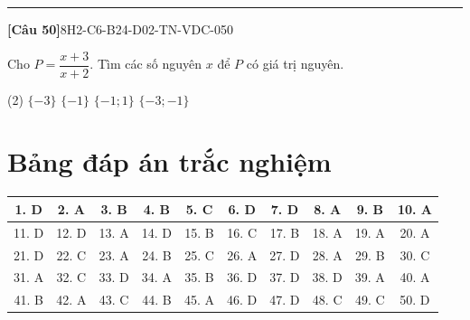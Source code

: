 \documentclass[12pt,a4paper]{article}
\newif\ifloigiai
\newenvironment{cauhoi}[2]{%
  \par\medskip\noindent\rule{\textwidth}{0.4pt}\par\nopagebreak
  \noindent\textbf{[#1]}\hfill{\scriptsize\ttfamily #2}\par\nopagebreak\smallskip}{\par}
\newcommand{\dapan}[1]{\ifloigiai\par\smallskip\noindent\textit{Đáp án:} \textbf{#1}\par\fi}
\begin{document}
\begin{cauhoi}{Câu 50}{8H2-C6-B24-D02-TN-VDC-050}
Cho $P=\dfrac{x+3}{x+2}$. Tìm các số nguyên $x$ để $P$ có giá trị nguyên.
\begin{tasks}(2)
\task $\{-3\}$
\task $\{-1\}$
\task $\{-1; 1\}$
\task $\{-3; -1\}$
\end{tasks}
\dapan{D}
\end{cauhoi}
\clearpage\section*{Bảng đáp án trắc nghiệm}
\begin{center}\begin{tabular}{|c|c|c|c|c|c|c|c|c|c|}
\hline
1. D & 2. A & 3. B & 4. B & 5. C & 6. D & 7. D & 8. A & 9. B & 10. A\\\hline
11. D & 12. D & 13. A & 14. D & 15. B & 16. C & 17. B & 18. A & 19. A & 20. A\\\hline
21. D & 22. C & 23. A & 24. B & 25. C & 26. A & 27. D & 28. A & 29. B & 30. C\\\hline
31. A & 32. C & 33. D & 34. A & 35. B & 36. D & 37. D & 38. D & 39. A & 40. A\\\hline
41. B & 42. A & 43. C & 44. B & 45. A & 46. D & 47. D & 48. C & 49. C & 50. D\\\hline
\end{tabular}\end{center}
\end{document}
